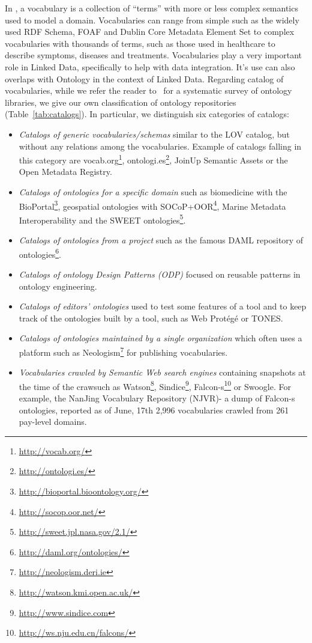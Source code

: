In \cite{glossairegld}, a vocabulary is a collection of ``terms'' with more or less complex semantics used to model a domain. Vocabularies can range from simple such as the widely used RDF Schema, FOAF and Dublin Core Metadata Element Set to complex vocabularies with thousands of terms, such as those used in healthcare to describe symptoms, diseases and treatments. Vocabularies play a very important role in Linked Data, specifically to help with data integration. It's use can also overlaps with Ontology in the context of Linked Data. Regarding catalog of vocabularies, while we refer the reader to~\cite{AquinJoWS12} for a systematic survey of ontology libraries, we give our own classification of ontology repositories (Table~\ref{tab:catalogs}).
In particular, we distinguish six categories of catalogs:
\begin{itemize}
 \item \textit{Catalogs of generic vocabularies/schemas} similar to the LOV catalog, but without any relations among the vocabularies. Example of catalogs falling in this category are vocab.org\footnote{\url{http://vocab.org/}}, ontologi.es\footnote{\url{http://ontologi.es/}}, JoinUp Semantic Assets or the Open Metadata Registry.
 \item \textit{Catalogs of ontologies for a specific domain} such as biomedicine with the BioPortal\footnote{\url{http://bioportal.bioontology.org/}}, geospatial ontologies with SOCoP+OOR\footnote{\url{http://socop.oor.net/}}, Marine Metadata Interoperability and the SWEET ontologies\footnote{\url{http://sweet.jpl.nasa.gov/2.1/}}.
 \item \textit{Catalogs of ontologies from a project} such as the famous DAML repository of ontologies\footnote{\url{http://daml.org/ontologies/}}.
 \item \textit{Catalogs of ontology Design Patterns (ODP)} focused on reusable patterns in ontology engineering.
 \item \textit{Catalogs of editors' ontologies} used to test some features of a tool and to keep track of the ontologies built by a tool, such as Web Prot\'{e}g\'{e} or TONES.
 \item \textit{Catalogs of ontologies maintained by a single organization} which often uses a platform such as Neologism\footnote{\url{http://neologism.deri.ie}} for publishing vocabularies.
 \item \textit{Vocabularies crawled by Semantic Web search engines} containing snapshots at the time of the crawsuch as Watson\footnote{\url{http://watson.kmi.open.ac.uk/}}, Sindice\footnote{\url{http://www.sindice.com}}, Falcon-s\footnote{\url{http://ws.nju.edu.cn/falcons/}} or Swoogle. For example, the NanJing Vocabulary Repository (NJVR)- a dump of Falcon-s ontologies, reported as of June, 17th 2,996 vocabularies crawled from 261 pay-level domains.
\end{itemize}

